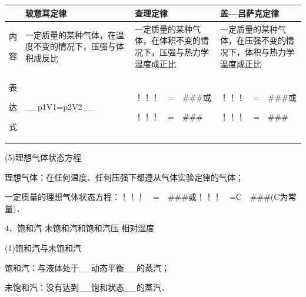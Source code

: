 \begin{longtable}[]{@{}llll@{}}
\toprule
& 玻意耳定律 & 查理定律 & 盖---吕萨克定律\tabularnewline
\midrule
\endhead
\begin{minipage}[t]{0.22\columnwidth}\raggedright
内

容\strut
\end{minipage} & \begin{minipage}[t]{0.22\columnwidth}\raggedright
一定质量的某种气体，在温度不变的情况下，压强与体积成反比\strut
\end{minipage} & \begin{minipage}[t]{0.22\columnwidth}\raggedright
一定质量的某种气体，在体积不变的情况下，压强与热力学温度成正比\strut
\end{minipage} & \begin{minipage}[t]{0.22\columnwidth}\raggedright
一定质量的某种气体，在压强不变的情况下，体积与热力学温度成正比\strut
\end{minipage}\tabularnewline
\begin{minipage}[t]{0.22\columnwidth}\raggedright
表

达

式\strut
\end{minipage} & \begin{minipage}[t]{0.22\columnwidth}\raggedright
\_\_p1V1=p2V2\_\_\strut
\end{minipage} & \begin{minipage}[t]{0.22\columnwidth}\raggedright
！！！　=　\#\#\#或

！！！　=　\#\#\#\strut
\end{minipage} & \begin{minipage}[t]{0.22\columnwidth}\raggedright
！！！　=　\#\#\#或

！！！　=　\#\#\#\strut
\end{minipage}\tabularnewline
\bottomrule
\end{longtable}

(5)理想气体状态方程

理想气体：在任何温度、任何压强下都遵从气体实验定律的气体；

一定质量的理想气体状态方程：！！！　=　\#\#\#或！！！　=C　\#\#\#(C为常量)．

4．饱和汽 未饱和汽和饱和汽压 相对湿度

(1)饱和汽与未饱和汽

饱和汽：与液体处于\_\_动态平衡\_\_的蒸汽；

未饱和汽：没有达到\_\_饱和状态\_\_的蒸汽．

